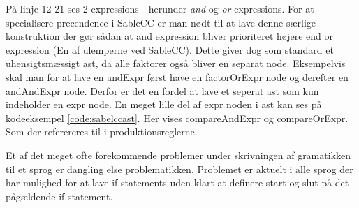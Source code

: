 \noindent På linje 12-21 ses 2 expressions - herunder \textit{and} og \textit{or} expressions. For at specialisere precendence i SableCC er man nødt til at lave denne særlige konstruktion der gør sådan at and expression bliver prioriteret højere end or expression (En af ulemperne ved SableCC). Dette giver dog som standard et uhensigtsmæssigt \gls{ast}, da alle faktorer også bliver en separat node. Eksempelvis skal man for at lave en andExpr først have en factorOrExpr node og derefter en andAndExpr node. Derfor er det en fordel at lave et seperat \gls{ast} som kun indeholder en expr node. En meget lille del af expr noden i \gls{ast} kan ses på kodeeksempel \ref{code:sabelccast}. Her vises compareAndExpr og compareOrExpr. Som der referereres til i produktionsreglerne.




\label{subsec:danglingelse}
Et af det meget ofte forekommende problemer under skrivningen af gramatikken til et sprog er dangling else problematikken. Problemet er aktuelt i alle sprog der har mulighed for at lave if-statements uden klart at definere start og slut på det pågældende if-statement.

